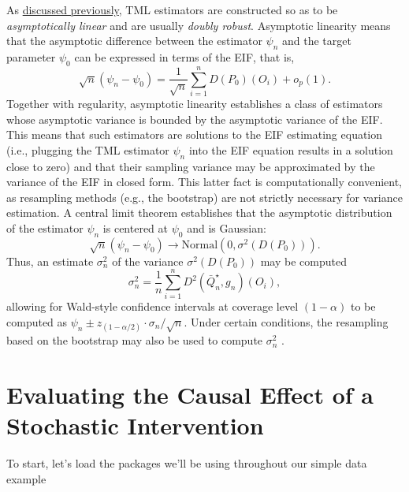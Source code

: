 \documentclass[
  12pt, krantz2,
]{krantz}
\theoremstyle{definition}
\theoremstyle{definition}
\theoremstyle{definition}
\newcommand{\1}{\mathbbm{1}}
\begin{document}
As \protect\hyperlink{tmle3}{discussed previously}, TML estimators are constructed so as to be
\emph{asymptotically linear} and are usually \emph{doubly robust}. Asymptotic linearity
means that the asymptotic difference between the estimator \(\psi_n\) and the
target parameter \(\psi_0\) can be expressed in terms of the EIF, that is,
\begin{equation}
  \sqrt{n}(\psi_n - \psi_0) = \frac{1}{\sqrt{n}}\sum_{i=1}^n D(P_0)(O_i) +
    o_p(1).
  \label{eq:asymplin-shift}
\end{equation}
Together with regularity, asymptotic linearity establishes a class of estimators
whose asymptotic variance is bounded by the asymptotic variance of the EIF. This
means that such estimators are solutions to the EIF estimating equation (i.e.,
plugging the TML estimator \(\psi_n\) into the EIF equation results in a solution
close to zero) and that their sampling variance may be approximated by the
variance of the EIF in closed form. This latter fact is computationally
convenient, as resampling methods (e.g., the bootstrap) are not strictly
necessary for variance estimation. A central limit theorem establishes that the
asymptotic distribution of the estimator \(\psi_n\) is centered at \(\psi_0\) and is
Gaussian:
\begin{equation}
  \sqrt{n}(\psi_n - \psi_0) \to \text{Normal}(0, \sigma^2(D(P_0))).
  \label{eq:tmle-gaussian-shift}
\end{equation}
Thus, an estimate \(\sigma_n^2\) of the variance \(\sigma^2(D(P_0))\) may be
computed
\begin{equation}
  \sigma_n^2 = \frac{1}{n} \sum_{i = 1}^{n} D^2(\bar{Q}_n^{\star}, g_n)(O_i),
  \label{eq:eif-var-shift}
\end{equation}
allowing for Wald-style confidence intervals at coverage level \((1 - \alpha)\) to
be computed as \(\psi_n \pm z_{(1 - \alpha/2)} \cdot \sigma_n / \sqrt{n}\). Under
certain conditions, the resampling based on the bootstrap may also be used to
compute \(\sigma_n^2\) \citep{vdl2011targeted}.

\hypertarget{evaluating-the-causal-effect-of-a-stochastic-intervention}{%
\section{Evaluating the Causal Effect of a Stochastic Intervention}\label{evaluating-the-causal-effect-of-a-stochastic-intervention}}

To start, let's load the packages we'll be using throughout our simple data example
\end{document}
